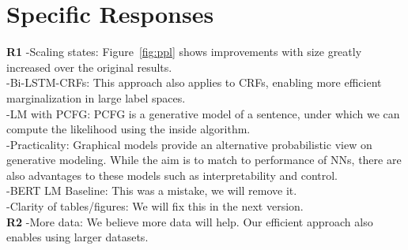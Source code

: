 \documentclass{article}
\begin{document}
\section{Specific Responses}
\textbf{R1} -Scaling states: Figure~\ref{fig:ppl} shows improvements with size greatly increased over the original results. \\
-Bi-LSTM-CRFs: This approach also applies to CRFs, enabling more efficient marginalization in large label spaces. \\
-LM with PCFG: PCFG is a generative model of a sentence, under which we can compute the likelihood using the inside algorithm.\\
-Practicality: Graphical models provide an alternative  probabilistic view on generative modeling. While the 
aim is to match to performance of NNs, there are also advantages to these models such as interpretability and control. \\
-BERT LM Baseline: This was a mistake, we will remove it.\\
-Clarity of tables/figures: We will fix this in the next version.\\
\textbf{R2} -More data: We believe more data will help. Our efficient approach also enables using larger datasets.\\
\end{document}
